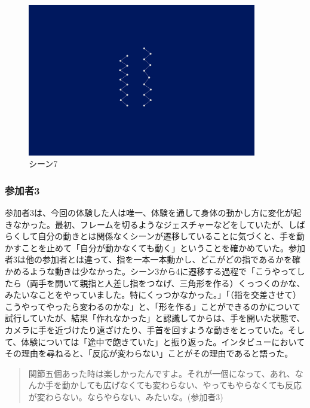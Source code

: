 \begin{figure}[H]
  \centering
  \includegraphics[width=10cm]{img/scene7.png}
  \caption{シーン7}
  \label{fig:scene7}
\end{figure}

\subsubsection*{参加者3}
参加者3は、今回の体験した人は唯一、体験を通して身体の動かし方に変化が起きなかった。最初、フレームを切るようなジェスチャーなどをしていたが、しばらくして自分の動きとは関係なくシーンが遷移していることに気づくと、手を動かすことを止めて「自分が動かなくても動く」ということを確かめていた。参加者3は他の参加者とは違って、指を一本一本動かし、どこがどの指であるかを確かめるような動きは少なかった。シーン3から4に遷移する過程で「こうやってしたら（両手を開いて親指と人差し指をつなげ、三角形を作る）くっつくのかな、みたいなことをやっていました。特にくっつかなかった。」「（指を交差させて）こうやってやったら変わるのかな」と、「形を作る」ことができるのかについて試行していたが、結果「作れなかった」と認識してからは、手を開いた状態で、カメラに手を近づけたり遠ざけたり、手首を回すような動きをとっていた。そして、体験については「途中で飽きていた」と振り返った。インタビューにおいてその理由を尋ねると、「反応が変わらない」ことがその理由であると語った。
\begin{quote}
  関節五個あった時は楽しかったんですよ。それが一個になって、あれ、なんか手を動かしても広げなくても変わらない、やってもやらなくても反応が変わらない。ならやらない、みたいな。(参加者3)  
\end{quote}

